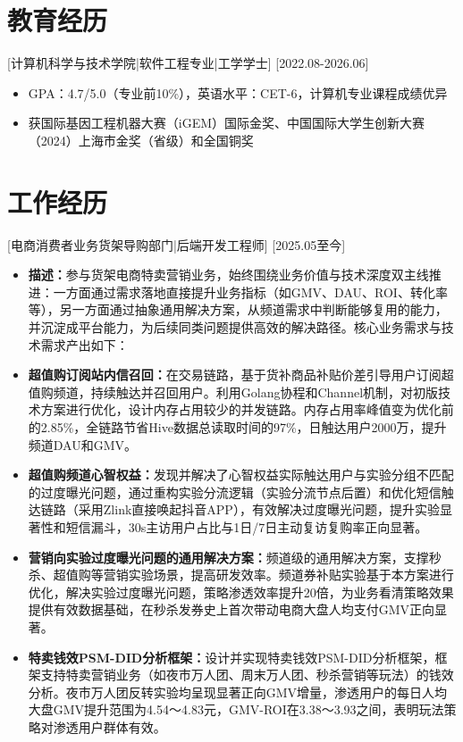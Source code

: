 \documentclass{style/template}
\begin{document}

\ResumeTitle

\section{教育经历}

[\textnormal{计算机科学与技术学院|软件工程专业|}工学学士]
[2022.08-2026.06]
\begin{itemize}
    \item GPA：4.7/5.0（专业前10\%），英语水平：CET-6，计算机专业课程成绩优异
    \item 获国际基因工程机器大赛（iGEM）国际金奖、中国国际大学生创新大赛（2024）上海市金奖（省级）和全国铜奖
\end{itemize}

\section{工作经历}

[\textnormal{电商消费者业务货架导购部门|}后端开发工程师]
[2025.05至今]
\begin{itemize}
    \item \textbf{描述：}参与货架电商特卖营销业务，始终围绕业务价值与技术深度双主线推进：一方面通过需求落地直接提升业务指标（如GMV、DAU、ROI、转化率等），另一方面通过抽象通用解决方案，从频道需求中判断能够复用的能力，并沉淀成平台能力，为后续同类问题提供高效的解决路径。核心业务需求与技术需求产出如下：
    \item \textbf{超值购订阅站内信召回：}在交易链路，基于货补商品补贴价差引导用户订阅超值购频道，持续触达并召回用户。利用Golang协程和Channel机制，对初版技术方案进行优化，设计内存占用较少的并发链路。内存占用率峰值变为优化前的2.85\%，全链路节省Hive数据总读取时间的97\%，日触达用户2000万，提升频道DAU和GMV。
    \item \textbf{超值购频道心智权益：}发现并解决了心智权益实际触达用户与实验分组不匹配的过度曝光问题，通过重构实验分流逻辑（实验分流节点后置）和优化短信触达链路（采用Zlink直接唤起抖音APP），有效解决过度曝光问题，提升实验显著性和短信漏斗，30s主访用户占比与1日/7日主动复访复购率正向显著。
    \item \textbf{营销向实验过度曝光问题的通用解决方案：}频道级的通用解决方案，支撑秒杀、超值购等营销实验场景，提高研发效率。频道券补贴实验基于本方案进行优化，解决实验过度曝光问题，策略渗透效率提升20倍，为业务看清策略效果提供有效数据基础，在秒杀发券史上首次带动电商大盘人均支付GMV正向显著。
    \item \textbf{特卖钱效PSM-DID分析框架：}设计并实现特卖钱效PSM-DID分析框架，框架支持特卖营销业务（如夜市万人团、周末万人团、秒杀营销等玩法）的钱效分析。夜市万人团反转实验均呈现显著正向GMV增量，渗透用户的每日人均大盘GMV提升范围为4.54～4.83元，GMV-ROI在3.38～3.93之间，表明玩法策略对渗透用户群体有效。
\end{itemize}
\end{document}
